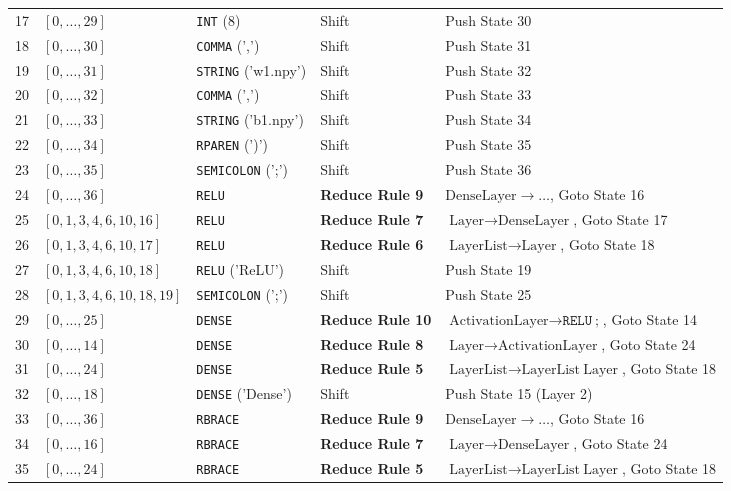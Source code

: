 \documentclass[11pt,a4paper]{article}
\begin{document}
\begin{table}[htbp]
\begin{tabular}{cllll}
17 & $[0, \dots, 29]$ & \texttt{INT} (8) & Shift & Push State 30 \\
18 & $[0, \dots, 30]$ & \texttt{COMMA} (',') & Shift & Push State 31 \\
19 & $[0, \dots, 31]$ & \texttt{STRING} ('w1.npy') & Shift & Push State 32 \\
20 & $[0, \dots, 32]$ & \texttt{COMMA} (',') & Shift & Push State 33 \\
21 & $[0, \dots, 33]$ & \texttt{STRING} ('b1.npy') & Shift & Push State 34 \\
22 & $[0, \dots, 34]$ & \texttt{RPAREN} (')') & Shift & Push State 35 \\
23 & $[0, \dots, 35]$ & \texttt{SEMICOLON} (';') & Shift & Push State 36 \\
24 & $[0, \dots, 36]$ & \texttt{RELU} & \textbf{Reduce Rule 9} & $\text{DenseLayer} \rightarrow \dots$, Goto State 16 \\
25 & $[0, 1, 3, 4, 6, 10, 16]$ & \texttt{RELU} & \textbf{Reduce Rule 7} & $\text{Layer} \rightarrow \text{DenseLayer}$, Goto State 17 \\
26 & $[0, 1, 3, 4, 6, 10, 17]$ & \texttt{RELU} & \textbf{Reduce Rule 6} & $\text{LayerList} \rightarrow \text{Layer}$, Goto State 18 \\
27 & $[0, 1, 3, 4, 6, 10, 18]$ & \texttt{RELU} ('ReLU') & Shift & Push State 19 \\
28 & $[0, 1, 3, 4, 6, 10, 18, 19]$ & \texttt{SEMICOLON} (';') & Shift & Push State 25 \\
29 & $[0, \dots, 25]$ & \texttt{DENSE} & \textbf{Reduce Rule 10}& $\text{ActivationLayer} \rightarrow \texttt{RELU} \ \texttt{;}$, Goto State 14 \\
30 & $[0, \dots, 14]$ & \texttt{DENSE} & \textbf{Reduce Rule 8} & $\text{Layer} \rightarrow \text{ActivationLayer}$, Goto State 24 \\
31 & $[0, \dots, 24]$ & \texttt{DENSE} & \textbf{Reduce Rule 5} & $\text{LayerList} \rightarrow \text{LayerList} \ \text{Layer}$, Goto State 18 \\
32 & $[0, \dots, 18]$ & \texttt{DENSE} ('Dense') & Shift & Push State 15 (Layer 2) \\
33 & $[0, \dots, 36]$ & \texttt{RBRACE} & \textbf{Reduce Rule 9} & $\text{DenseLayer} \rightarrow \dots$, Goto State 16 \\
34 & $[0, \dots, 16]$ & \texttt{RBRACE} & \textbf{Reduce Rule 7} & $\text{Layer} \rightarrow \text{DenseLayer}$, Goto State 24 \\
35 & $[0, \dots, 24]$ & \texttt{RBRACE} & \textbf{Reduce Rule 5} & $\text{LayerList} \rightarrow \text{LayerList} \ \text{Layer}$, Goto State 18 \\

\end{tabular}
\end{table}
\end{document}
